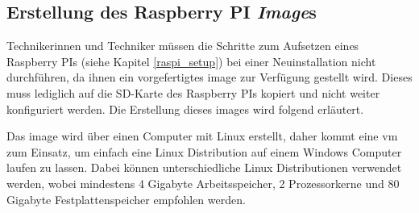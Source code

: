 \subsection{Erstellung des Raspberry PI \textit{Image}s}
Technikerinnen und Techniker müssen die Schritte zum Aufsetzen eines Raspberry PIs (siehe Kapitel \ref{raspi_setup}) bei einer Neuinstallation nicht durchführen, da ihnen ein vorgefertigtes \gls{image} zur Verfügung gestellt wird. Dieses muss lediglich auf die SD-Karte des Raspberry PIs kopiert und nicht weiter konfiguriert werden. Die Erstellung dieses \gls{image}s wird folgend erläutert.

Das \gls{image} wird über einen Computer mit Linux erstellt, daher kommt eine \ac{vm} zum Einsatz, um einfach eine Linux Distribution auf einem Windows Computer laufen zu lassen. Dabei können unterschiedliche Linux Distributionen verwendet werden, wobei mindestens 4 Gigabyte Arbeitsspeicher, 2 Prozessorkerne und 80 Gigabyte Festplattenspeicher empfohlen werden. 

